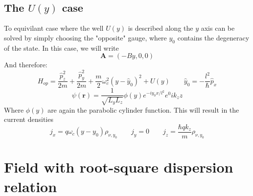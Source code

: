 \documentclass{article}
\begin{document}
\subsection{The $U(y)$ case}
To equivilant case where the well $U(y)$ is described along the $y$ axis can be solved by simply choosing the "opposite" gauge, where $y_0$ contains the degeneracy of the state. In this case, we will write
\begin{equation}
    \boldsymbol{A} = (-By, 0, 0)
\end{equation}
And therefore:
\begin{equation}
    H_{op} = \frac{\hat{p}_z^2}{2m} + \frac{\hat{p}_y^2}{2m} + \frac{m}{2}\omega_c^2(y - \hat{y}_0)^2 + U(y) \qquad \hat{y}_0 = -\frac{l^2}{\hbar}\hat{p}_x
\end{equation}
\begin{equation}
    \psi(\boldsymbol{r}) = \frac{1}{\sqrt{L_yL_z}}\phi(y)e^{-iy_0x/l^2}e^0ik_zz
\end{equation}
Where $\phi(y)$ are again the parabolic cylinder function. This will result in the current densities
\begin{equation}
    j_x = q\omega_c(y-y_0)\rho_{\nu,y_0}
    \qquad
    j_y = 0
    \qquad
    j_z = \frac{\hbar q k_z}{m}\rho_{\nu,y_0}
\end{equation}

\section{Field with root-square dispersion relation}
\end{document}
